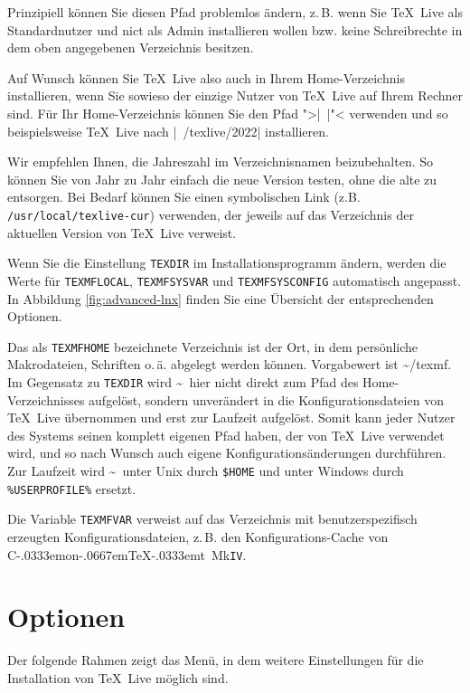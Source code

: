 \documentclass[12pt,ngerman,a4paper,fullparskip]{scrreprt}
\newcommand{\TL}{\TeX\ Live\xspace}
\newcommand{\acro}[1]{\texttt{#1}}
\newcommand{\dirname}[1]{\texttt{#1}}
\newcommand\ConTeXt{C\kern-.0333emon\-\kern-.0667em\TeX\kern-.0333emt}
\begin{document}
Prinzipiell können Sie diesen Pfad problemlos ändern, z.\,B. wenn Sie \TL als Standardnutzer und nict als Admin installieren wollen bzw. keine Schreibrechte in dem oben angegebenen Verzeichnis besitzen.

Auf Wunsch können Sie \TL also auch in Ihrem Home-Verzeichnis installieren, wenn Sie sowieso der einzige Nutzer von \TL auf Ihrem Rechner sind. Für Ihr Home-Verzeichnis können Sie den Pfad ">|~|"< verwenden und so beispielsweise \TL nach  |~/texlive/2022| installieren.

Wir empfehlen Ihnen, die Jahreszahl im Verzeichnisnamen beizubehalten. So können Sie von Jahr zu Jahr einfach die neue Version testen, ohne die alte zu entsorgen. Bei Bedarf können Sie einen symbolischen
Link (z.B. \dirname{/usr/local/texlive-cur}) verwenden, der jeweils auf das Verzeichnis der aktuellen Version von \TL verweist.

Wenn Sie die Einstellung \dirname{TEXDIR} im Installationsprogramm ändern, werden die Werte für
\dirname{TEXMFLOCAL}, \dirname{TEXMFSYSVAR} und \dirname{TEXMFSYSCONFIG} automatisch angepasst. In Abbildung \ref{fig:advanced-lnx} finden Sie eine Übersicht der entsprechenden Optionen.

Das als \dirname{TEXMFHOME} bezeichnete Verzeichnis ist der Ort, in dem persönliche Makrodateien,
Schriften o.\,ä. abgelegt werden können. Vorgabewert ist \textasciitilde/texmf. Im Gegensatz zu \dirname{TEXDIR} wird \textasciitilde\ hier nicht direkt zum Pfad des Home-Verzeichnisses aufgelöst, sondern unverändert in die Konfigurationsdateien von \TL übernommen und erst zur Laufzeit aufgelöst. Somit kann jeder Nutzer des Systems seinen komplett eigenen Pfad haben, der von \TL verwendet wird, und so nach Wunsch auch eigene Konfigurationsänderungen durchführen. Zur Laufzeit wird \textasciitilde\ unter Unix durch \dirname{\$HOME} und unter Windows durch \verb|%USERPROFILE%| ersetzt.

Die Variable \dirname{TEXMFVAR} verweist auf das Verzeichnis mit benutzerspezifisch
erzeugten Konfigurationsdateien, z.\,B. den Konfigurations-Cache von \ConTeXt\ Mk\acro{IV}.

\clearpage

\section{Optionen}\label{sec:options}

Der folgende Rahmen zeigt das Menü, in dem weitere Einstellungen für die Installation von \TL möglich sind.
\end{document}
